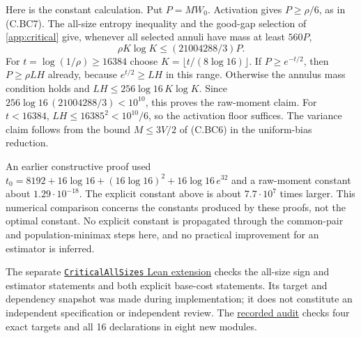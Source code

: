 Here is the constant calculation. Put $P=MW_0$. Activation gives
$P\ge\rho/6$, as in (C.BC7). The all-size entropy inequality and the good-gap
selection of \cref{app:critical} give, whenever all selected annuli have mass at least $560P$,
\[
 \rho K\log K\le(21004288/3)P.
\]
For $t=\log(1/\rho)\ge16384$ choose
$K=\lfloor t/(8\log16)\rfloor$. If $P\ge e^{-t/2}$, then
$P\ge\rho LH$ already, because $e^{t/2}\ge LH$ in this range. Otherwise the annulus
mass condition holds and $LH\le256\log16\,K\log K$.
Since $256\log16\,(21004288/3)<10^{10}$, this proves the raw-moment claim.
For $t<16384$, $LH\le16385^2<10^{10}/6$, so the activation floor suffices.
The variance claim follows from the bound $M\le3V/2$ of (C.BC6) in the
uniform-bias reduction.

An earlier constructive proof used
$t_0=8192+16\log16+(16\log16)^2+16\log16\,e^{32}$ and a raw-moment
constant about $1.29\cdot10^{-18}$. The explicit constant above is about
$7.7\cdot10^7$ times larger. This numerical comparison concerns the
constants produced by these proofs, not the optimal constant. No explicit
constant is propagated through the common-pair and population-minimax
steps here, and no practical improvement for an estimator is inferred.

The separate
\href{https://github.com/davidiach/adaptive-threshold-estimation/tree/ebd36676693b66814bc2a379529499428ab98650/lean/ThresholdHC/CriticalAllSizes}{\texttt{CriticalAllSizes} Lean extension}
checks the all-size
sign and estimator statements and both explicit base-cost statements.
Its target and dependency snapshot was made during implementation; it
does not constitute an independent specification or independent review.
The \href{https://github.com/davidiach/adaptive-threshold-estimation/blob/ebd36676693b66814bc2a379529499428ab98650/results/critical_all_sizes_001.json}{recorded audit}
checks four exact targets and all 16 declarations in eight new modules.
